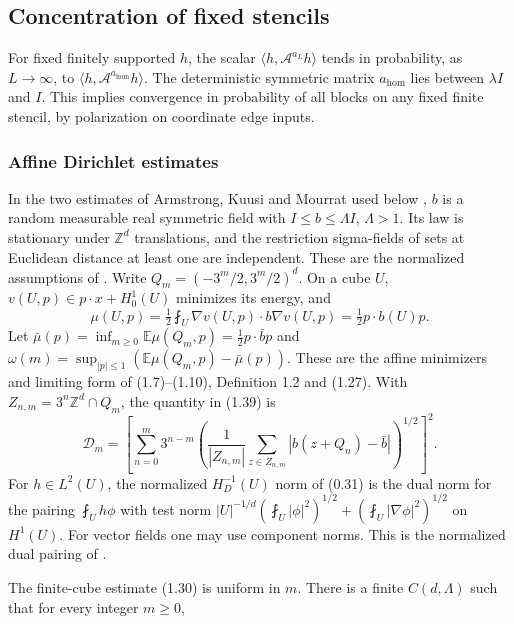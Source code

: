 \documentclass[11pt]{article}
\begin{document}
\subsection{Concentration of fixed stencils}\label{subsec:stencil}

For fixed finitely supported \(h\), the scalar \(\langle h,\mathcal A^{a_L}h\rangle\) tends in probability, as \(L\to\infty\), to \(\langle h,\mathcal A^{a_{\mathrm{hom}}}h\rangle\). The deterministic symmetric matrix \(a_{\mathrm{hom}}\) lies between \(\lambda I\) and \(I\). This implies convergence in probability of all blocks on any fixed finite stencil, by polarization on coordinate edge inputs.

\subsubsection{Affine Dirichlet estimates}\label{affine-dirichlet-estimates}

In the two estimates of Armstrong, Kuusi and Mourrat used below \cite[Propositions 1.7 and 1.10]{AKM}, \(b\) is a random measurable real symmetric field with \(I\le b\le\Lambda I\), \(\Lambda>1\). Its law is stationary under \(\mathbb Z^d\) translations, and the restriction sigma-fields of sets at Euclidean distance at least one are independent. These are the normalized assumptions of \cite[(0.6)--(0.11)]{AKM}. Write \(Q_m=(-3^m/2,3^m/2)^d\). On a cube \(U\), \(v(U,p)\in p\cdot x+H_0^1(U)\) minimizes its energy, and \[
 \mu(U,p)=\tfrac12\fint_U \nabla v(U,p)\cdot b\nabla v(U,p)
         =\tfrac12 p\cdot b(U)p .
\] Let \(\bar\mu(p)=\inf_{m\ge0}\mathbb E\mu(Q_m,p)=\tfrac12p\cdot\bar b p\) and \(\omega(m)=\sup_{|p|\le1}(\mathbb E\mu(Q_m,p)-\bar\mu(p))\). These are the affine minimizers and limiting form of (1.7)--(1.10), Definition 1.2 and (1.27). With \(Z_{n,m}=3^n\mathbb Z^d\cap Q_m\), the quantity in (1.39) is \[
 \mathcal D_m=\left[\sum_{n=0}^m3^{n-m}
     \left(\frac1{|Z_{n,m}|}\sum_{z\in Z_{n,m}}
                     |b(z+Q_n)-\bar b|\right)^{1/2}\right]^2 .
\] For \(h\in L^2(U)\), the normalized \(H_D^{-1}(U)\) norm of (0.31) is the dual norm for the pairing \(\fint_U h\phi\) with test norm \(|U|^{-1/d}(\fint_U|\phi|^2)^{1/2}+(\fint_U|\nabla\phi|^2)^{1/2}\) on \(H^1(U)\). For vector fields one may use component norms. This is the normalized dual pairing of \cite[(0.31)]{AKM}.

The finite-cube estimate (1.30) is uniform in \(m\). There is a finite \(C(d,\Lambda)\) such that for every integer \(m\ge0\),
\end{document}
